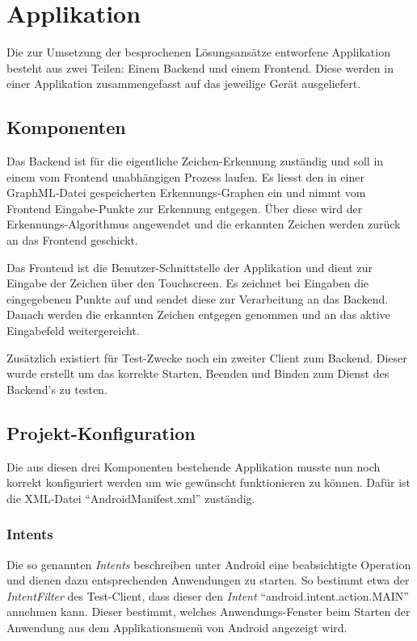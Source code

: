 \chapter{Applikation}

Die zur Umsetzung der besprochenen Lösungsansätze entworfene Applikation besteht aus zwei Teilen: Einem Backend und einem Frontend. Diese werden in einer Applikation zusammengefasst auf das jeweilige Gerät ausgeliefert.

\section{Komponenten}

Das Backend ist für die eigentliche Zeichen-Erkennung zuständig und soll in einem vom Frontend unabhängigen Prozess laufen. Es liesst den in einer GraphML-Datei gespeicherten Erkennungs-Graphen ein und nimmt vom Frontend Eingabe-Punkte zur Erkennung entgegen. Über diese wird der Erkennungs-Algorithmus angewendet und die erkannten Zeichen werden zurück an das Frontend geschickt.

Das Frontend ist die Benutzer-Schnittstelle der Applikation und dient zur Eingabe der Zeichen über den Touchscreen. Es zeichnet bei Eingaben die eingegebenen Punkte auf und sendet diese zur Verarbeitung an das Backend. Danach werden die erkannten Zeichen entgegen genommen und an das aktive Eingabefeld weitergereicht.

Zusätzlich existiert für Test-Zwecke noch ein zweiter Client zum Backend. Dieser wurde erstellt um das korrekte Starten, Beenden und Binden zum Dienst des Backend's zu testen.

\section{Projekt-Konfiguration}

Die aus diesen drei Komponenten bestehende Applikation musste nun noch korrekt konfiguriert werden um wie gewünscht funktionieren zu können. Dafür ist die XML-Datei ``AndroidManifest.xml'' zuständig.

\subsection{Intents}

Die so genannten \emph{Intents} beschreiben unter Android eine beabsichtigte Operation und dienen dazu entsprechenden Anwendungen zu starten. So bestimmt etwa der \emph{IntentFilter} des Test-Client, dass dieser den \emph{Intent} ``android.intent.action.MAIN'' annehmen kann. Dieser bestimmt, welches Anwendungs-Fenster beim Starten der Anwendung aus dem Applikationsmenü von Android angezeigt wird.

